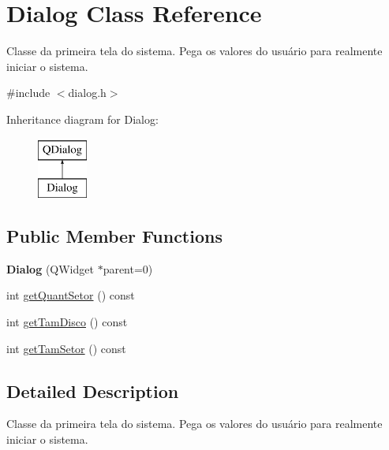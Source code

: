 \hypertarget{classDialog}{\section{Dialog Class Reference}
\label{classDialog}
}


Classe da primeira tela do sistema. Pega os valores do usuário para realmente iniciar o sistema.  




{\ttfamily \#include $<$dialog.\+h$>$}

Inheritance diagram for Dialog\+:\begin{figure}[H]
\begin{center}
\leavevmode
\includegraphics[height=2.000000cm]{classDialog}
\end{center}
\end{figure}
\subsection*{Public Member Functions}
\begin{DoxyCompactItemize}
\item 
\hypertarget{classDialog_acfa2063f9f962d394c6a645b6e7e08d8}{{\bfseries Dialog} (Q\+Widget $\ast$parent=0)}\label{classDialog_acfa2063f9f962d394c6a645b6e7e08d8}

\item 
int \hyperlink{classDialog_a6b0119c5bf8caa17599f5886dbbfc785}{get\+Quant\+Setor} () const 
\item 
int \hyperlink{classDialog_ac632d4306f67630cc30a1706323819bb}{get\+Tam\+Disco} () const 
\item 
int \hyperlink{classDialog_a7b5648b3e00170bd86f875de20f17eda}{get\+Tam\+Setor} () const 
\end{DoxyCompactItemize}


\subsection{Detailed Description}
Classe da primeira tela do sistema. Pega os valores do usuário para realmente iniciar o sistema. 

